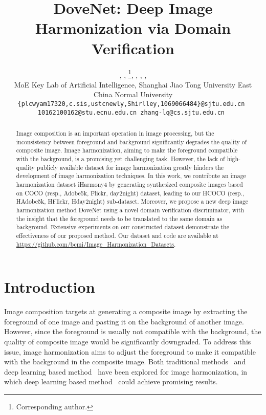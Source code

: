 \documentclass[10pt,twocolumn,letterpaper]{article}
\begin{document}
\title{DoveNet: Deep Image Harmonization via Domain Verification}

\author{, , \thanks{Corresponding author.}, , , , \\
 MoE Key Lab of Artificial Intelligence, Shanghai Jiao Tong University
 East China Normal University\\
{\tt\small\{plcwyam17320,c.sis,ustcnewly,Shirlley,1069066484\}@sjtu.edu.cn }\\
{\tt\small10162100162@stu.ecnu.edu.cn zhang-lq@cs.sjtu.edu.cn }
}

\maketitle
\thispagestyle{empty}

\begin{abstract}
Image composition is an important operation in image processing, but the inconsistency between foreground and background significantly degrades the quality of composite image. Image harmonization, aiming to make the foreground compatible with the background, is a promising yet challenging task. However, the lack of high-quality publicly available dataset for image harmonization greatly hinders the development of image harmonization techniques. In this work, we contribute an image harmonization dataset iHarmony4 by generating synthesized composite images based on COCO (resp., Adobe5k, Flickr, day2night) dataset, leading to our HCOCO (resp., HAdobe5k, HFlickr, Hday2night) sub-dataset. Moreover, we propose a new deep image harmonization method DoveNet using a novel domain verification discriminator, with the insight that the foreground needs to be translated to the same domain as background. Extensive experiments on our constructed dataset demonstrate the effectiveness of our proposed method. Our dataset and code are available at \href{https://github.com/bcmi/Image\_Harmonization\_Datasets}{https://github.com/bcmi/Image\_Harmonization\_Datasets}.
\end{abstract}



\section{Introduction} \label{sec:intro}

Image composition targets at generating a composite image by extracting the foreground of one image and pasting it on the background of another image. However, since the foreground is usually not compatible with the background, the quality of composite image would be significantly downgraded. To address this issue, image harmonization aims to adjust the foreground to make it compatible with the background in the composite image. Both traditional methods~\cite{lalonde2007using,xue2012understanding,zhu2015learning} and deep learning based method~\cite{tsai2017deep,xiaodong2019improving} have been explored for image harmonization, in which deep learning based method~\cite{tsai2017deep,xiaodong2019improving} could achieve promising results.
\end{document}
